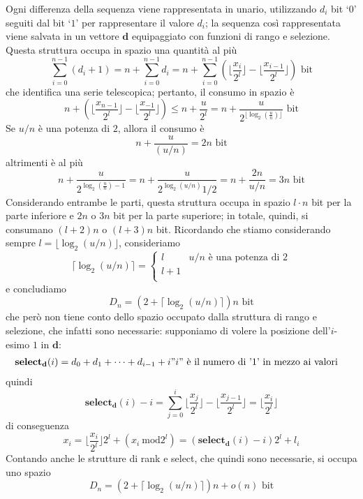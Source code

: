 Ogni differenza della sequenza viene rappresentata in unario, utilizzando $d_i$ bit
`$0$' seguiti dal bit `$1$' per rappresentare il valore $d_i$; la sequenza
così rappresentata viene salvata in un vettore $\mathbf{d}$ equipaggiato
con funzioni di rango e selezione. Questa struttura occupa in spazio
una quantità al più
$$
	\sum_{i = 0}^{n - 1}(d_i + 1) = n + \sum_{i=0}^{n-1} d_i
	= n + \sum_{i = 0}^{n-1} (\lfloor{\frac{x_i}{2^l}}\rfloor - \lfloor{\frac{x_{i-1}}{2^l}}\rfloor) \text{ bit}
$$
che identifica una serie telescopica; pertanto, il consumo in spazio è
$$
	n + (\lfloor{\frac{x_{n-1}}{2^l}}\rfloor -\lfloor{\frac{x_{-1}}{2^l}}\rfloor) \leq n + \frac{u}{2^l}
	= n + \frac{u}{2^{\lfloor \log_2(\frac{u}{n})\rfloor}} \text{ bit}
$$
Se $u/n$ è una potenza di $2$, allora il consumo è
$$
	n + \frac{u}{(u/n)} = 2n \text{ bit}
$$
altrimenti è al più
$$
	n + \frac{u}{2^{\log_2(\frac{u}{n}) - 1 }} = n + \frac{u}{2^{\log_2(u/n)}1/2} = n + \frac{2n}{u/n} = 3n \text{ bit}
$$
Considerando entrambe le parti, questa struttura occupa in spazio $l\cdot n$ bit
per la parte inferiore e $2n$ o $3n$ bit per la parte superiore; in totale,
quindi, si consumano $(l+2)n$ o $(l+3)n$ bit.
Ricordando che stiamo considerando sempre $l = \lfloor \log_2(u/n) \rfloor$, consideriamo
$$
	\lceil \log_2(u/n) \rceil =
	\begin{cases}
		l & u/n \text{ è una potenza di } 2 \\
		l +1                                \\
	\end{cases}
$$
e concludiamo
$$
	D_n = (2 + \lceil \log_2(u/n) \rceil) n \text{ bit}
$$
che però non tiene conto dello spazio occupato dalla struttura di rango e selezione,
che infatti sono necessarie: supponiamo di volere la posizione dell'$i$-esimo $1$ in $\mathbf{d}$:
\begin{align*}
	\mathbf{select_d}(i) = d_0 + d_1 + \cdots + d_{i-1} + i & "i" \text{ è il numero di '1' in mezzo ai valori}
\end{align*}
quindi
$$
	\mathbf{select_d}(i) - i = \sum_{j = 0}^i \lfloor{\frac{x_{j}}{2^l}}\rfloor -\lfloor{\frac{x_{j-1}}{2^l}}\rfloor = \lfloor \frac{x_i}{2^l} \rfloor
$$
di conseguenza
$$
	x_i =  \lfloor \frac{x_i}{2^l} \rfloor 2^l + (x_i ~ \mathrm{mod} {2^l}) = (\mathbf{select_d}(i) - i ) 2^l + l_i
$$
Contando anche le strutture di rank e select, che quindi sono necessarie, si occupa uno spazio
$$
	D_n = (2 + \lceil \log_2(u/n) \rceil)n + o(n) \text{ bit}
$$

